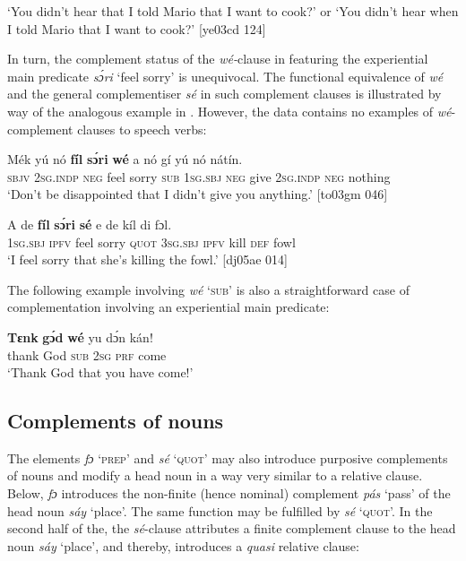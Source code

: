 \glt ‘You didn’t hear that I told Mario that I want to cook?’ or 
‘You didn’t hear when I told Mario that I want to cook?’ [ye03cd 124]
\z

In turn, the complement status of the \textit{wé-}clause in  featuring the experiential main predicate \textit{sɔ́ri} ‘feel sorry’ is unequivocal. The functional equivalence of \textit{wé} and the general complementiser \textit{sé} in such complement clauses is illustrated by way of the analogous example in . However, the data contains no examples of \textit{wé}{}-complement clauses to speech verbs:


\ea%
    \label{ex:key:1414}
    \gll Mék    yú    nó  \textbf{fíl}  \textbf{sɔ́ri}    \textbf{wé}  a    nó  gí  yú    nó  nátín.\\
\textsc{sbjv}    \textsc{2sg.indp}  \textsc{neg}  feel  sorry  \textsc{sub}  \textsc{1sg.sbj}  \textsc{neg}  give  \textsc{2sg.indp}  \textsc{neg}  nothing\\

\glt ‘Don’t be disappointed that I didn’t give you anything.’ [to03gm 046]
\z


\ea%
    \label{ex:key:1415}
    \gll A    de  \textbf{fíl}  \textbf{sɔ́ri}    \textbf{sé}    e    de  kíl  di  fɔl.\\
\textsc{1sg.sbj}  \textsc{ipfv}  feel  sorry  \textsc{quot}    \textsc{3sg.sbj}  \textsc{ipfv}  kill  \textsc{def}  fowl\\

\glt ‘I feel sorry that she’s killing the fowl.’ [dj05ae 014]
\z

The following example involving \textit{wé} ‘\textsc{sub}’ is also a straightforward case of complementation involving an experiential main predicate: 


\ea%
    \label{ex:key:1416}
    \gll \textbf{Tɛnk}  \textbf{gɔ́d}  \textbf{wé}  yu  dɔ́n  kán!\\
thank  God  \textsc{sub}  \textsc{2sg}  \textsc{prf}  come\\

\glt ‘Thank God that you have come!’
\z

\subsection{Complements of nouns}\label{sec:10.5.8}

The elements \textit{fɔ} ‘\textsc{prep}’ and \textit{sé} ‘\textsc{quot}’ may also introduce purposive complements of nouns and modify a head noun in a way very similar to a relative clause. Below, \textit{fɔ} introduces the non-finite (hence nominal) complement \textit{pás} ‘pass’ of the head noun \textit{sáy} ‘place’. The same function may be fulfilled by \textit{sé} ‘\textsc{quot}’. In the second half of the, the \textit{sé}{}-clause attributes a finite complement clause to the head noun \textit{sáy} ‘place’, and thereby, introduces a \textit{quasi} relative clause:


